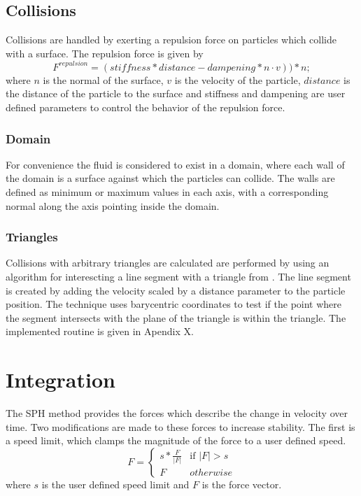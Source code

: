 \subsection{Collisions}

Collisions are handled by exerting a repulsion force on particles which collide
with a surface. The repulsion force is given by
$$
F^{repulsion} = (stiffness * distance - dampening * n \cdot v))*n;
$$
where $n$ is the normal of the surface, $v$ is the velocity of the particle,
$distance$ is the distance of the particle to the surface and
stiffness and dampening are user defined parameters to control the behavior of
the repulsion force.\cite{Krog2010}

\subsubsection{Domain}
For convenience the fluid is considered to exist in a domain, where each wall
of the domain is a surface against which the particles can collide. The walls
are defined as minimum or maximum values in each axis, with a corresponding
normal along the axis pointing inside the domain. 

\subsubsection{Triangles}

Collisions with arbitrary triangles are calculated are performed by using an
algorithm for interescting a line segment with a triangle from \cite{Ericson}. The line segment is
created by adding the velocity scaled by a distance parameter to the particle
position. The technique uses barycentric coordinates to test if the point where
the segment intersects with the plane of the triangle is within the triangle.
The implemented routine is given in Apendix X.



\section{Integration}

The SPH method provides the forces which describe the change in velocity over
time. Two modifications are made to these forces to increase stability. The
first is a speed limit, which clamps the magnitude of the force to a user defined speed.
$$
F = \begin{cases} s * \frac{F}{|F|} & \text{if $|F| > s$}
    \\
    F & \text{$otherwise$}
\end{cases}
$$
where $s$ is the user defined speed limit and $F$ is the force vector.

